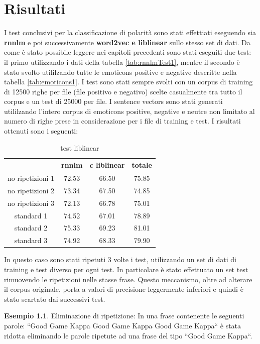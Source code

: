 \documentclass[a4paper,12pt,openright,twoside]{report}
\theoremstyle{definition}
\newtheorem{es}{Esempio}[section]
\begin{document}
\chapter{Risultati}
I test conclusivi per la classificazione di polarità sono stati effettiati eseguendo sia \textbf{rnnlm} e poi successivamente \textbf{word2vec e liblinear} sullo stesso set di dati. Da come è stato possibile leggere nei capitoli precedenti sono stati eseguiti due test: il primo utilizzando i dati della tabella  \ref{tab:rnnlmTest1}, mentre il secondo è stato svolto utililzando tutte le emoticons positive e negative descritte nella tabella \ref{tab:emoticons1}. 
I test sono stati sempre svolti con un corpus di training di 12500 righe per file (file positivo e negativo) scelte casualmente tra tutto il corpus e un test di 25000 per file. I sentence vectors sono stati generati utililzando l'intero corpus di emoticons positive, negative e neutre non limitato al numero di righe prese in considerazione per i file di training e test.
I risultati ottenuti sono i seguenti:
\begin{table}[h]
\begin{center}
\begin{tabular}{|c|c|c|c|}
\hline
& rnnlm & c liblinear & totale \\
\hline
no ripetizioni 1 & 72.53 & 66.50 & 75.85  \\
\hline
no ripetizioni 2 & 73.34 & 67.50 & 74.85  \\
\hline
no ripetizioni 3 & 72.13 & 66.78 & 75.01  \\
\hline
standard 1 & 74.52 & 67.01 & 78.89 \\
\hline
standard 2 & 75.33 & 69.23 & 81.01 \\
\hline
standard 3 & 74.92 & 68.33 & 79.90 \\
\hline
\end{tabular}
\end{center}
\caption{test liblinear}
\label{tab:test1}
\end{table}

In questo caso sono stati ripetuti 3 volte i test, utilizzando un set di dati di training e test diverso per ogni test. In particolare è stato effettuato un set test rimuovendo le ripetizioni nelle stasse frase. Questo meccanismo, oltre ad alterare il corpus originale, porta a valori di precisione leggermente inferiori e quindi è stato scartato dai successivi test.
\begin{es}
Eliminazione di ripetizione: In una frase contenente le seguenti parole:  ``Good Game Kappa Good Game Kappa Good Game Kappa`` è stata ridotta eliminando le parole ripetute ad una frase del tipo ``Good Game Kappa``.
\end{es}
\end{document}
